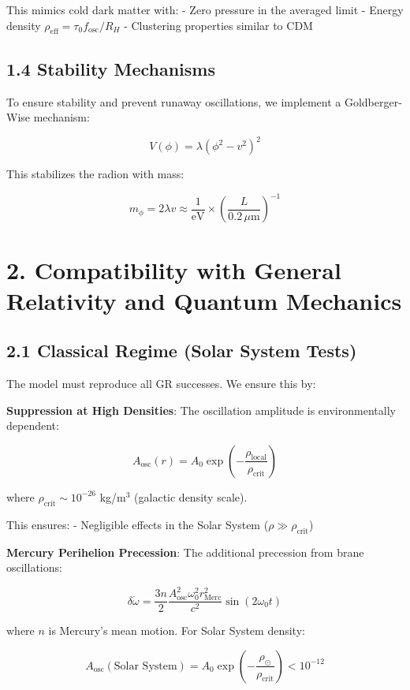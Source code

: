 \documentclass[
  11pt,
]{report}
\begin{document}
This mimics cold dark matter with: - Zero pressure in the averaged limit
- Energy density \(\rho_\text{eff} = \tau_0 f_\text{osc} / R_H\) -
Clustering properties similar to CDM

\subsection{1.4 Stability Mechanisms}\label{stability-mechanisms}

To ensure stability and prevent runaway oscillations, we implement a
Goldberger-Wise mechanism:

\[V(\phi) = \lambda \left( \phi^2 - v^2 \right)^2\]

This stabilizes the radion with mass:

\[m_\phi = 2\lambda v \approx \frac{1}{\text{eV}} \times \left(\frac{L}{0.2\,\mu\text{m}}\right)^{-1}\]

\section{2. Compatibility with General Relativity and Quantum
Mechanics}\label{compatibility-with-general-relativity-and-quantum-mechanics}

\subsection{2.1 Classical Regime (Solar System
Tests)}\label{classical-regime-solar-system-tests}

The model must reproduce all GR successes. We ensure this by:

\textbf{Suppression at High Densities}: The oscillation amplitude is
environmentally dependent:

\[A_\text{osc}(r) = A_0 \exp\left(-\frac{\rho_\text{local}}{\rho_\text{crit}}\right)\]

where \(\rho_\text{crit} \sim 10^{-26}\) kg/m\(^3\) (galactic density
scale).

This ensures: - Negligible effects in the Solar System
(\(\rho \gg \rho_\text{crit}\))

\textbf{Mercury Perihelion Precession}: The additional precession from
brane oscillations:

\[\delta\dot{\omega} = \frac{3n}{2} \frac{A_\text{osc}^2 \omega_0^2 r_\text{Merc}^2}{c^2} \sin(2\omega_0 t)\]

where \(n\) is Mercury's mean motion. For Solar System density:

\[A_\text{osc}(\text{Solar System}) = A_0 \exp\left(-\frac{\rho_\odot}{\rho_\text{crit}}\right) < 10^{-12}\]
\end{document}

